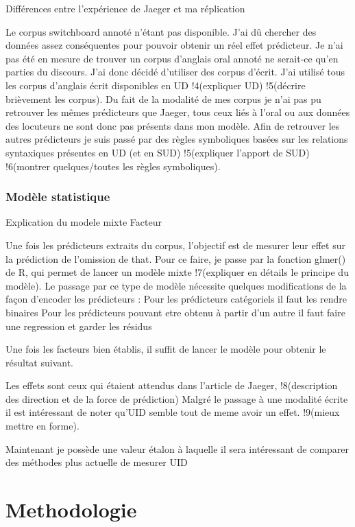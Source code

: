 \documentclass{article}
\begin{document}
    Différences entre l'expérience de Jaeger et ma réplication

	Le corpus switchboard annoté n'étant pas disponible. J'ai dû chercher des données assez conséquentes pour pouvoir obtenir un réel effet prédicteur.
	Je n'ai pas été en mesure de trouver un corpus d'anglais oral annoté ne serait-ce qu'en parties du discours. J'ai donc décidé d'utiliser des corpus d'écrit.
	J'ai utilisé tous les corpus d'anglais écrit disponibles en UD !4(expliquer UD) !5(décrire brièvement les corpus).
	Du fait de la modalité de mes corpus je n'ai pas pu retrouver les mêmes prédicteurs que Jaeger, tous ceux liés à l'oral ou aux données des locuteurs ne sont donc pas présents dans mon modèle.
	Afin de retrouver les autres prédicteurs je suis passé par des règles symboliques basées sur les relations syntaxiques présentes en UD (et en SUD) !5(expliquer l'apport de SUD) !6(montrer quelques/toutes les règles symboliques).


\subsubsection{Modèle statistique}
	Explication du modele mixte 
	Facteur

	Une fois les prédicteurs extraits du corpus, l'objectif est de mesurer leur effet sur la prédiction de l'omission de that.
	Pour ce faire, je passe par la fonction glmer() de R, qui permet de lancer un modèle mixte !7(expliquer en détails le principe du modèle).
	Le passage par ce type de modèle nécessite quelques modifications de la façon d'encoder les prédicteurs : 
		Pour les prédicteurs catégoriels il faut les rendre binaires
		Pour les prédicteurs pouvant etre obtenu à partir d'un autre il faut faire une regression et garder les résidus

	Une fois les facteurs bien établis, il suffit de lancer le modèle pour obtenir le résultat suivant.

	Les effets sont ceux qui étaient attendus dans l'article de Jaeger, !8(description des direction et de la force de prédiction)
	Malgré le passage à une modalité écrite il est intéressant de noter qu'UID semble tout de meme avoir un effet. !9(mieux mettre en forme).

	Maintenant je possède une valeur étalon à laquelle il sera intéressant de comparer des méthodes plus actuelle de mesurer UID

\section{Methodologie}
\end{document}
